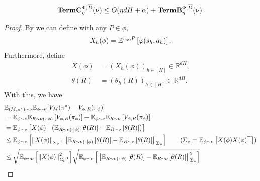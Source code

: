 \begin{lemma}\label{lem: bound Rcompe}
    \begin{align*}
       \textbf{\textup{TermC}}_\eta^{\Phi, \overline{D}}(\nu) \leq O(\eta dH+ \alpha) + \textbf{\textup{TermB}}_\eta^{\Phi, \overline{D}}(\nu). 
    \end{align*}

\end{lemma}
\begin{proof}
By  we can define with any $P\in\phi$, 
\begin{align*}
    X_h(\phi) = \mathbb{E}^{\pi_\phi, P}\left[\varphi(s_h,a_h)\right]. 
\end{align*}
Furthermore, define 
\begin{align*}
    X(\phi) &= (X_h(\phi))_{h\in[H]}\in\mathbb{R}^{dH}, \\
    \theta(R) &= (\theta_h(R))_{h\in[H]}\in\mathbb{R}^{dH}. 
\end{align*}
With this, we have 
\begin{align*}
    &\E_{(M, \pi^\star)\sim \nu} \E_{\phi\sim \nu}[V_M(\pi^\star) - V_{\phi, R}(\pi_\phi)]   \\ 
    &=\E_{\phi \sim \nu}\E_{R \sim \nu(\cdot|\phi)}\left[ V_{\phi, R}(\pi_{\phi})\right] - \E_{\phi \sim \nu}\E_{R \sim \nu}\left[V_{\phi, R}(\pi_{\phi})\right]
    \\&= \E_{\phi \sim \nu}\left[X(\phi)^\top\left(\E_{R \sim \nu(\cdot|\phi)}\left[\theta(R)\right] - \E_{R \sim \nu}\left[\theta(R)\right]\right)\right]
    \\&\le  \E_{\phi \sim \nu}\left[\left\|X(\phi)\right\|_{\Sigma_{\nu}^{-1}}\left\|\E_{R \sim \nu(\cdot|\phi)}\left[\theta(R)\right] - \E_{R \sim \nu}\left[\theta(R)\right]\right\|_{\Sigma_{\nu}}\right] \tag{$\Sigma_{\nu} = \E_{\phi \sim \nu}\left[X(\phi)X(\phi)^\top\right]$}
    \\&\le \sqrt{ \E_{\phi \sim \nu}\left[\left\|X(\phi)\right\|_{\Sigma_{\nu}^{-1}}^2\right]} \sqrt{\E_{\phi \sim \nu}\left[\left\|\E_{R \sim \nu(\cdot|\phi)}\left[\theta(R)\right] - \E_{R \sim \nu}\left[\theta(R)\right]\right\|_{\Sigma_{\nu}}^2\right]}

\end{align*}
\end{proof}
